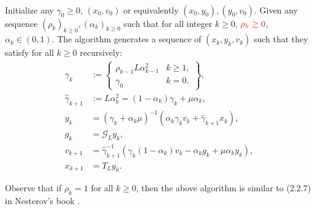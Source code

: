 \documentclass[12pt]{article}
\begin{document}
    \begin{definition}\label{def:wapg}
        \;\\
        Initialize any $\gamma_0 \ge 0$, $(x_0, v_0)$ or equivalently $(x_0, y_0), (y_0, v_0)$. 
        Given any sequence $(\rho_k)_{k\ge0}, (\alpha_k)_{k \ge0}$ such that for all integer $k\ge 0$, $\textcolor{red}{\rho_k \ge 0}$, $\alpha_k \in (0, 1)$. 
        The algorithm generates a sequence of $(x_k, y_k, v_k)$ such that they satisfy for all $k\ge 0$ recursively: 
        \begin{align*}
            \gamma_k &:= \left.\begin{cases}
                \rho_{k -1}L\alpha_{k - 1}^2 & k \ge 1,
                \\
                \gamma_0 & k = 0. 
            \end{cases}\right\rbrace,
            \\
            \hat \gamma_{k + 1} &:= L\alpha_k^2 = (1 - \alpha_k)\gamma_k + \mu \alpha_k, 
            \\
            y_k &= 
            (\gamma_k + \alpha_k \mu)^{-1}(\alpha_k \gamma_k v_k + \hat\gamma_{k + 1} x_k), 
            \\
            g_k &= \mathcal G_L y_k, 
            \\
            v_{k + 1} &= 
            \hat\gamma^{-1}_{k + 1}
            (\gamma_k(1 - \alpha_k) v_k - \alpha_k g_k + \mu \alpha_k y_k), 
            \\
            x_{k + 1} &= T_L y_k. 
        \end{align*}
    \end{definition}
    \begin{observation}
        Observe that if $\rho_k = 1$ for all $k\ge 0$, then the above algorithm is similar to (2.2.7) in Nesterov's book \cite{nesterov_lectures_2018}. 
    \end{observation}
    
\end{document}
